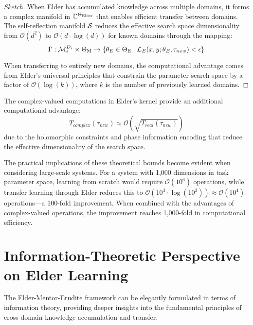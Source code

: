 \begin{proof}[Sketch]
When Elder has accumulated knowledge across multiple domains, it forms a complex manifold in $\mathbb{C}^{\Theta_{\text{Elder}}}$ that enables efficient transfer between domains. The self-reflection manifold $\mathcal{S}$ reduces the effective search space dimensionality from $\mathcal{O}(d^2)$ to $\mathcal{O}(d \cdot \log(d))$ for known domains through the mapping:
\begin{equation}
\Gamma: \mathcal{M}_i^{D_i} \times \Theta_{\text{M}} \rightarrow \{\theta_E \in \Theta_{\text{E}} \mid \mathcal{L}_E(x, y; \theta_E, \tau_{new}) < \epsilon\}
\end{equation}

When transferring to entirely new domains, the computational advantage comes from Elder's universal principles that constrain the parameter search space by a factor of $\mathcal{O}(\log(k))$, where $k$ is the number of previously learned domains.
\end{proof}

\begin{corollary}
The complex-valued computations in Elder's kernel provide an additional computational advantage:
\begin{equation}
T_{complex}(\tau_{new}) \approx \mathcal{O}(\sqrt{T_{real}(\tau_{new})})
\end{equation}
due to the holomorphic constraints and phase information encoding that reduce the effective dimensionality of the search space.
\end{corollary}

The practical implications of these theoretical bounds become evident when considering large-scale systems. For a system with 1,000 dimensions in task parameter space, learning from scratch would require $\mathcal{O}(10^6)$ operations, while transfer learning through Elder reduces this to $\mathcal{O}(10^3 \cdot \log(10^3)) \approx \mathcal{O}(10^4)$ operations—a 100-fold improvement. When combined with the advantages of complex-valued operations, the improvement reaches 1,000-fold in computational efficiency.

\section{Information-Theoretic Perspective on Elder Learning}

The Elder-Mentor-Erudite framework can be elegantly formulated in terms of information theory, providing deeper insights into the fundamental principles of cross-domain knowledge accumulation and transfer.

